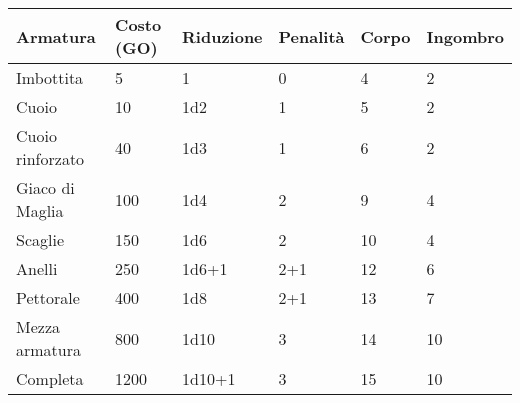 \documentclass[12pt,a4paper,twoside,openany]{book}
\begin{document}
\label{tabella-armature}
\begin{tabular}{llllll}
\textbf{Armatura} & \textbf{Costo (GO)} & \textbf{Riduzione} & \textbf{Penalità} & \textbf{Corpo} &\textbf{Ingombro}\\
\toprule		%
Imbottita  		& 5		& 1		& 0	 & 4  &	2\\
Cuoio 			& 10	& 1d2 	& 1	 & 5  &	2\\
Cuoio rinforzato& 40	& 1d3 	& 1  & 6  & 2\\
Giaco di Maglia & 100 	& 1d4 	& 2  & 9  & 4\\
Scaglie			& 150 	& 1d6 	& 2  & 10 & 4\\
Anelli 			& 250  	& 1d6+1 & 2+1  & 12 & 6\\
Pettorale  		& 400  	& 1d8 	& 2+1  & 13 & 7\\
Mezza armatura  & 800 	& 1d10 	& 3  & 14 & 10\\
Completa		& 1200 	& 1d10+1& 3  & 15 & 10\\
\end{tabular}\bigskip
\end{document}
